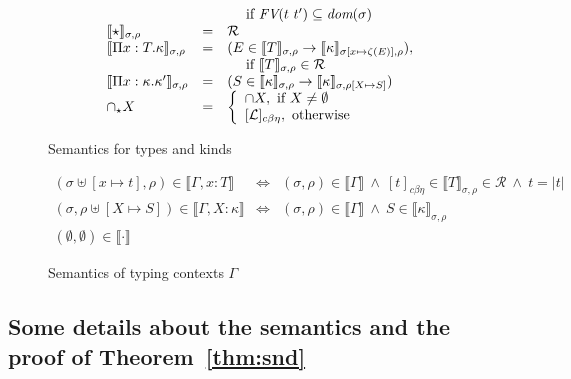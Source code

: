 \documentclass{article}
\newcommand{\choice}[0]{\zeta}
\newcommand{\elcap}[0]{\cap}
\newcommand{\interp}[1]{\llbracket #1 \rrbracket}
\newcommand{\cbe}[0]{c\beta\eta}
\begin{document}
\begin{figure}
\[\begin{array}{lll}
\ &\ &\ \ \ \textnormal{ if }\textit{FV}(t\ t')\subseteq\textit{dom}(\sigma) 
\\
\interp{\star}_{\sigma,\rho} & = & \mathcal{R} \\ 
\interp{\Pi x:T.\kappa}_{\sigma,\rho} & = & 
(E\in\interp{T}_{\sigma,\rho} \to \interp{\kappa}_{\sigma[x\mapsto \choice(E)],\rho}),\\
\ &\ &\ \ \ \textnormal{ if }\interp{T}_{\sigma,\rho}\in\mathcal{R} \\
\interp{\Pi x:\kappa.\kappa'}_{\sigma,\rho} & = & (S\in\interp{\kappa}_{\sigma,\rho} \to \interp{\kappa}_{\sigma,\rho[X\mapsto S]}) \\
\elcap_\star X & = & \left\{\begin{array}{l}
                                         \, \negthinspace\elcap X, \textnormal{ if } X\neq\emptyset\\
                                         \, \negthinspace[\mathcal{L}]_{\cbe},\textnormal{ otherwise}
                                       \end{array}\right. \\
\end{array}
\]
\caption{Semantics for types and kinds}
\label{fig:semtp}
\end{figure}

\begin{figure}
\[
\begin{array}{lll}
(\sigma\uplus[x\mapsto t],\rho)\in\interp{\Gamma,x:T} & \Leftrightarrow & (\sigma,\rho)\in\interp{\Gamma} \ \wedge\ 
 [t]_{\cbe}\in\interp{T}_{\sigma,\rho}\in\mathcal{R}\ \wedge\ t = |t| \\
(\sigma,\rho\uplus[X\mapsto S])\in\interp{\Gamma,X:\kappa} & \Leftrightarrow & (\sigma,\rho)\in\interp{\Gamma} \ \wedge\ 
S\in\interp{\kappa}_{\sigma,\rho} \\
(\emptyset,\emptyset)\in\interp{\cdot}
\end{array}
\]
\caption{Semantics of typing contexts $\Gamma$}
\label{fig:semctxt}
\end{figure}

\subsection{Some details about the semantics and the proof of Theorem~\ref{thm:snd}}
\label{sec:snd}
\end{document}
